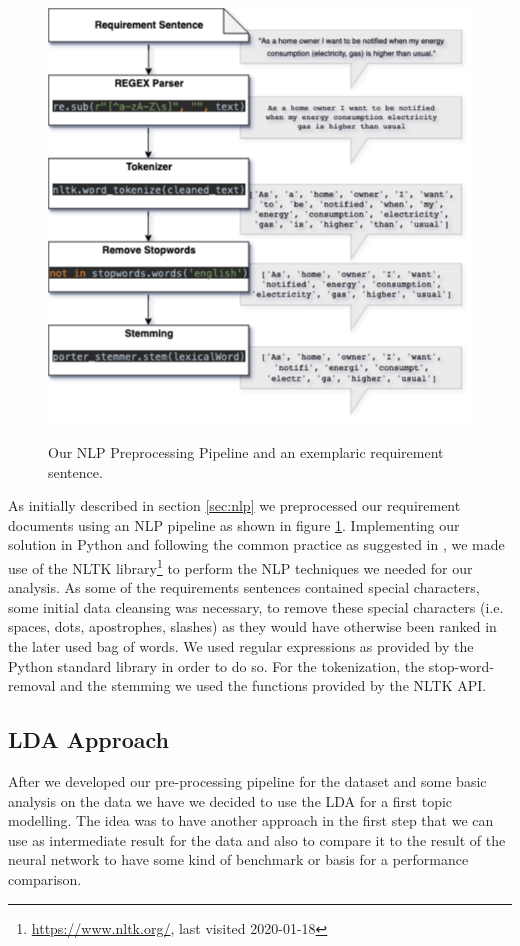 \begin{figure}[ht]
  \caption{Our NLP Preprocessing Pipeline and an exemplaric requirement sentence.}
  \centering
    \includegraphics[width=\textwidth]{figures/NLP Pipeline.png}
    \label{fig:nlp_pipeline}
\end{figure}

As initially described in section \ref{sec:nlp} we preprocessed our requirement documents using an NLP pipeline as shown in figure \ref{fig:nlp_pipeline}. Implementing our solution in Python and following the common practice as suggested in \cite{ferrari_natural_2018}, we made use of the NLTK library\footnote{\url{https://www.nltk.org/}, last visited 2020-01-18} to perform the NLP techniques we needed for our analysis. As some of the requirements sentences contained special characters, some initial data cleansing was necessary, to remove these special characters (i.e. spaces, dots, apostrophes, slashes) as they would have otherwise been ranked in the later used bag of words. We used regular expressions as provided by the Python standard library in order to do so. For the tokenization, the stop-word-removal and the stemming we used the functions provided by the NLTK API.

\subsection{LDA Approach} %
\label{sub:own_lda}
After we developed our pre-processing pipeline for the dataset and some basic analysis on the data we have we decided to use the LDA for a first topic modelling. The idea was to have another approach in the first step that we can use as intermediate result for the data and also to compare it to the result of the neural network to have some kind of benchmark or basis for a performance comparison.


